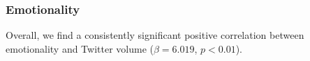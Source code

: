 \documentclass[letterpaper]{article}
\begin{document}
\subsubsection{Emotionality}
Overall, we find a consistently significant positive correlation between emotionality and Twitter volume ($\beta=6.019$, $p<0.01$). 


\end{document}
